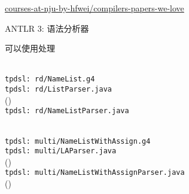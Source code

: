 
\begin{frame}{}

  \begin{center}
	\href{https://github.com/courses-at-nju-by-hfwei/compilers-papers-we-love/tree/master/parsing}
	{courses-at-nju-by-hfwei/compilers-papers-we-love}
  \end{center}
\end{frame}

\begin{frame}{}
  \begin{center}
    ANTLR 3: 语法分析器

    \vspace{0.50cm}
    \vspace{0.60cm}

    可以使用处理
  \end{center}
\end{frame}

\begin{frame}{}
  \begin{center}
	 \\[20pt]
	\texttt{tpdsl: rd/NameList.g4}  \\[40pt]
	\pause
	\texttt{tpdsl: rd/ListParser.java}
	\\ (\texttt{}) \\[30pt]
	\pause
	\texttt{tpdsl: rd/NameListParser.java}
  \end{center}
\end{frame}

\begin{frame}{}
  \begin{center}
	 \\[20pt]
	\texttt{tpdsl: multi/NameListWithAssign.g4}  \\[40pt]
	\pause
	\texttt{tpdsl: multi/LAParser.java}
	\\(\texttt{}) \\[30pt]
	\pause
	\texttt{tpdsl: multi/NameListWithAssignParser.java}
	\\(\texttt{})
  \end{center}
\end{frame}

